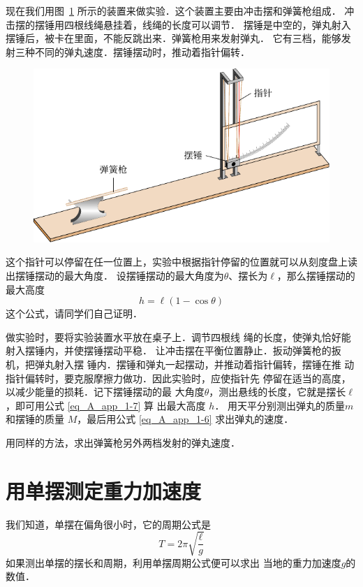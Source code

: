 现在我们用图~\ref{fig_A_10-21} 所示的装置来做实验．这个装置主要由冲击摆和弹簧枪组成．
冲击摆的摆锤用四根线绳悬挂着，线绳的长度可以调节．
摆锤是中空的，弹丸射入摆锤后，被卡在里面，不能反跳出来．弹簧枪用来发射弹丸．
它有三档，能够发射三种不同的弹丸速度．摆锤摆动时，推动着指针偏转．
\begin{figure}[htbp]
	\centering
	\includegraphics{fig/A/10-21.pdf}
	\caption{}\label{fig_A_10-21}
\end{figure}
这个指针可以停留在任一位置上，实验中根据指针停留的位置就可以从刻度盘上读出摆锤摆动的最大角度．
设摆锤摆动的最大角度为$\theta$、摆长为$\ell$，那么摆锤摆动的最大高度
\begin{equation}\label{eq_A_app_1-7}
    h=\ell(1-\cos\theta)
\end{equation}
这个公式，请同学们自己证明．





做实验时，要将实验装置水平放在桌子上．调节四根线
绳的长度，使弹丸恰好能射入摆锤内，并使摆锤摆动平稳．
让冲击摆在平衡位置静止．扳动弹簧枪的扳机，把弹丸射入摆
锤内．摆锤和弹丸一起摆动，并推动着指针偏转，摆锤在推
动指针偏转时，要克服摩擦力做功．因此实验时，应使指针先
停留在适当的高度，以减少能量的损耗．记下摆锤摆动的最
大角度$\theta$，测出悬线的长度，它就是摆长$\ell$，即可用公式 \eqref{eq_A_app_1-7} 算
出最大高度 $h$．
用天平分别测出弹丸的质量$m$和摆锤的质量
$M$，最后用公式 \eqref{eq_A_app_1-6} 求出弹丸的速度．

用同样的方法，求出弹簧枪另外两档发射的弹丸速度．

\section{用单摆测定重力加速度}
我们知道，单摆在偏角很小时，它的周期公式是
\[T=2\pi\sqrt{\frac{\ell}{g}}  \]
如果测出单摆的摆长和周期，利用单摆周期公式便可以求出
当地的重力加速度$g$的数值．

